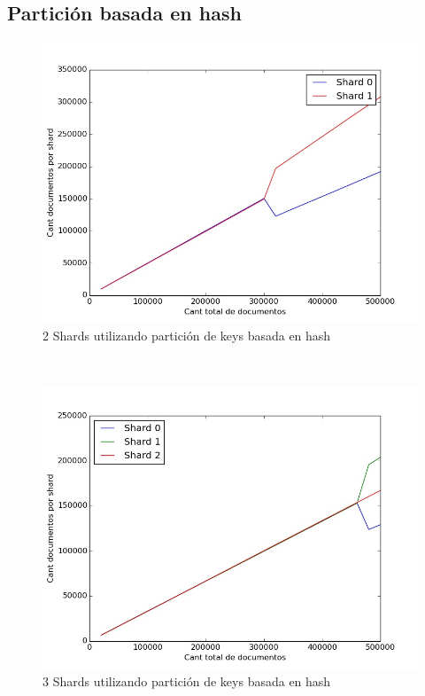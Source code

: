 ~

\subsection{Partición basada en hash}

\begin{figure}[!h]
  \begin{center}
      \includegraphics[scale=0.4]{imagenes/hash1.jpg}
      \caption{2 Shards utilizando partición de keys basada en hash}
      \label{fig:contra1}
  \end{center}
\end{figure}

~

\begin{figure}[!h]
  \begin{center}
      \includegraphics[scale=0.4]{imagenes/hash2.jpg}
      \caption{3 Shards utilizando partición de keys basada en hash}
      \label{fig:contra1}
  \end{center}
\end{figure}

~

